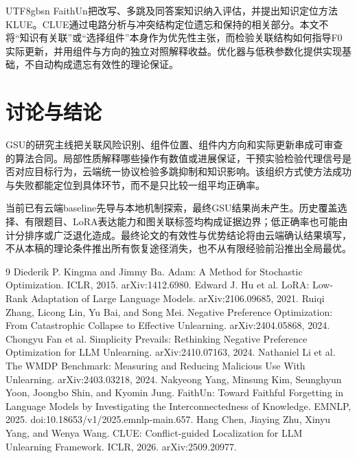 \documentclass[sigconf,anonymous,review]{acmart}
\begin{document}
\begin{CJK*}{UTF8}{gbsn}
FaithUn把改写、多跳及同答案知识纳入评估，并提出知识定位方法KLUE\cite{faithun}。CLUE通过电路分析与冲突结构定位遗忘和保持的相关部分\cite{clue}。本文不将“知识有关联”或“选择组件”本身作为优先性主张，而检验关联结构如何指导F0实际更新，并用组件与方向的独立对照解释收益。优化器与低秩参数化提供实现基础\cite{adam,lora}，不自动构成遗忘有效性的理论保证。

\section{讨论与结论}
GSU的研究主线把关联风险识别、组件位置、组件内方向和实际更新串成可审查的算法合同。局部性质解释哪些操作有数值或进展保证，干预实验检验代理信号是否对应目标行为，云端统一协议检验多跳抑制和知识影响。该组织方式使方法成功与失败都能定位到具体环节，而不是只比较一组平均正确率。

当前已有云端baseline先导与本地机制探索，最终GSU结果尚未产生。历史覆盖选择、有限题目、LoRA表达能力和图关联标签均构成证据边界；低正确率也可能由计分排序或广泛退化造成。最终论文的有效性与优势结论将由云端确认结果填写，不从本稿的理论条件推出所有恢复途径消失，也不从有限经验前沿推出全局最优。

\begin{thebibliography}{9}
 Diederik P. Kingma and Jimmy Ba. Adam: A Method for Stochastic Optimization. ICLR, 2015. arXiv:1412.6980.
 Edward J. Hu et al. LoRA: Low-Rank Adaptation of Large Language Models. arXiv:2106.09685, 2021.
 Ruiqi Zhang, Licong Lin, Yu Bai, and Song Mei. Negative Preference Optimization: From Catastrophic Collapse to Effective Unlearning. arXiv:2404.05868, 2024.
 Chongyu Fan et al. Simplicity Prevails: Rethinking Negative Preference Optimization for LLM Unlearning. arXiv:2410.07163, 2024.
 Nathaniel Li et al. The WMDP Benchmark: Measuring and Reducing Malicious Use With Unlearning. arXiv:2403.03218, 2024.
 Nakyeong Yang, Minsung Kim, Seunghyun Yoon, Joongbo Shin, and Kyomin Jung. FaithUn: Toward Faithful Forgetting in Language Models by Investigating the Interconnectedness of Knowledge. EMNLP, 2025. doi:10.18653/v1/2025.emnlp-main.657.
 Hang Chen, Jiaying Zhu, Xinyu Yang, and Wenya Wang. CLUE: Conflict-guided Localization for LLM Unlearning Framework. ICLR, 2026. arXiv:2509.20977.
\end{thebibliography}

\appendix

\end{CJK*}
\end{document}

